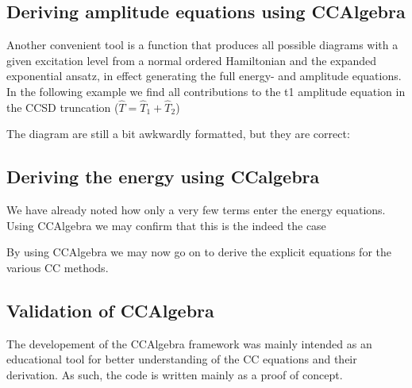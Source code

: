 \begin{minipage}{\linewidth}
\end{minipage}

\subsection{Deriving amplitude equations using CCAlgebra}

Another convenient tool is a function that produces all possible
diagrams with a given excitation level from a normal ordered
Hamiltonian and the expanded exponential ansatz, in effect generating
the full energy- and amplitude equations. In the following example we
find all contributions to the t1 amplitude equation in the CCSD
truncation ($\hat{T} = \hat{T}_1 + \hat{T}_2$)

\begin{minipage}{\linewidth}
\end{minipage}

The diagram are still a bit awkwardly formatted, but they are correct:

\begin{minipage}{\linewidth}
\end{minipage}

\subsection{Deriving the energy using CCalgebra}

We have already noted how only a very few terms enter the energy
equations. Using CCAlgebra we may confirm that this is the indeed the
case

\begin{minipage}{\linewidth}
\end{minipage}
By using CCAlgebra we may now go on to derive the explicit equations for the various CC methods. 

\subsection{Validation of CCAlgebra}

The developement of the CCAlgebra framework was mainly intended as an educational tool for better understanding of the CC equations and their derivation. As such, the code is written mainly as a proof of concept. 


